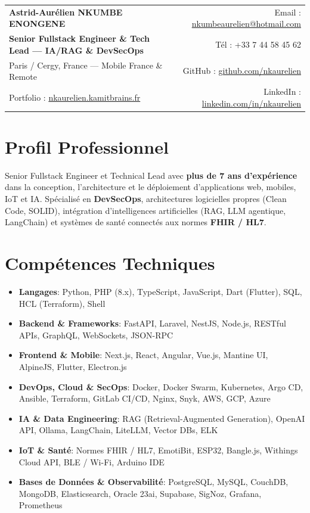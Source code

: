 \documentclass[a4paper,10pt]{article}
\newcommand{\resumeSubHeadingListStart}{\begin{itemize}[leftmargin=*, itemsep=2pt, topsep=2pt]}
\newcommand{\resumeSubHeadingListEnd}{\end{itemize}}
\begin{document}
\begin{tabular*}{\textwidth}{l@{\extracolsep{\fill}}r}
  \textbf{{\Large Astrid-Aurélien NKUMBE ENONGENE}} & Email : \href{mailto:nkumbeaurelien@hotmail.com}{nkumbeaurelien@hotmail.com}\\
  \textbf{\small Senior Fullstack Engineer \& Tech Lead --- IA/RAG \& DevSecOps} & Tél : +33 7 44 58 45 62\\
  Paris / Cergy, France --- Mobile France \& Remote & GitHub : \href{https://github.com/nkaurelien}{github.com/nkaurelien}\\
  Portfolio : \href{https://nkaurelien.kamitbrains.fr}{nkaurelien.kamitbrains.fr} & LinkedIn : \href{https://www.linkedin.com/in/nkaurelien/}{linkedin.com/in/nkaurelien}\\
\end{tabular*}

\vspace{3pt}

\section{Profil Professionnel}
Senior Fullstack Engineer et Technical Lead avec \textbf{plus de 7 ans d'expérience} dans la conception, l'architecture et le déploiement d'applications web, mobiles, IoT et IA. Spécialisé en \textbf{DevSecOps}, architectures logicielles propres (Clean Code, SOLID), intégration d'intelligences artificielles (RAG, LLM agentique, LangChain) et systèmes de santé connectés aux normes \textbf{FHIR / HL7}.

\section{Compétences Techniques}
 \resumeSubHeadingListStart
   \item{\textbf{Langages}{: Python, PHP (8.x), TypeScript, JavaScript, Dart (Flutter), SQL, HCL (Terraform), Shell}}
   \item{\textbf{Backend \& Frameworks}{: FastAPI, Laravel, NestJS, Node.js, RESTful APIs, GraphQL, WebSockets, JSON-RPC}}
   \item{\textbf{Frontend \& Mobile}{: Next.js, React, Angular, Vue.js, Mantine UI, AlpineJS, Flutter, Electron.js}}
   \item{\textbf{DevOps, Cloud \& SecOps}{: Docker, Docker Swarm, Kubernetes, Argo CD, Ansible, Terraform, GitLab CI/CD, Nginx, Snyk, AWS, GCP, Azure}}
   \item{\textbf{IA \& Data Engineering}{: RAG (Retrieval-Augmented Generation), OpenAI API, Ollama, LangChain, LiteLLM, Vector DBs, ELK}}
   \item{\textbf{IoT \& Santé}{: Normes FHIR / HL7, EmotiBit, ESP32, Bangle.js, Withings Cloud API, BLE / Wi-Fi, Arduino IDE}}
   \item{\textbf{Bases de Données \& Observabilité}{: PostgreSQL, MySQL, CouchDB, MongoDB, Elasticsearch, Oracle 23ai, Supabase, SigNoz, Grafana, Prometheus}}
 \resumeSubHeadingListEnd
\end{document}
